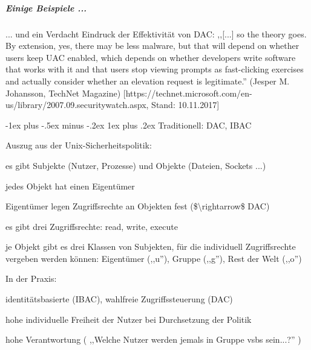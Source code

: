\documentclass[a4paper]{article}
\makeatletter
\renewcommand{\subsubsection}{\@startsection{subsubsection}{3}{0mm}%
 {-1ex plus -.5ex minus -.2ex}%
 {1ex plus .2ex}%
 {\normalfont\small\bfseries}}
\makeatother
\begin{document}
\begin{multicols}{3}
    \subparagraph{Einige Beispiele ...}


    ... und ein Verdacht Eindruck der Effektivität von DAC: ,,{[}...{]} so
    the theory goes. By extension, yes, there may be less malware, but that
    will depend on whether users keep UAC enabled, which depends on whether
    developers write software that works with it and that users stop viewing
    prompts as fast-clicking exercises and actually consider whether an
    elevation request is legitimate.'' (Jesper M. Johansson, TechNet
    Magazine)
    {[}https://technet.microsoft.com/en-us/library/2007.09.securitywatch.aspx,
    Stand: 10.11.2017{]}


    \subsubsection{Traditionell: DAC, IBAC}

    Auszug aus der Unix-Sicherheitspolitik:

    \begin{itemize*}
        \item
        es gibt Subjekte (Nutzer, Prozesse) und Objekte (Dateien, Sockets ...)
        \item
        jedes Objekt hat einen Eigentümer
        \item
        Eigentümer legen Zugriffsrechte an Objekten fest
        (\$\textbackslash rightarrow\$ DAC)
        \item
        es gibt drei Zugriffsrechte: read, write, execute
        \item
        je Objekt gibt es drei Klassen von Subjekten, für die individuell
        Zugriffsrechte vergeben werden können: Eigentümer (,,u''), Gruppe
        (,,g''), Rest der Welt (,,o'')
    \end{itemize*}

    In der Praxis:

    \begin{itemize*}
        \item
        identitätsbasierte (IBAC), wahlfreie Zugriffssteuerung (DAC)
        \item
        hohe individuelle Freiheit der Nutzer bei Durchsetzung der Politik
        \item
        hohe Verantwortung ( ,,Welche Nutzer werden jemals in Gruppe vsbs
        sein...?'' )
    \end{itemize*}


\end{multicols}
\end{document}
